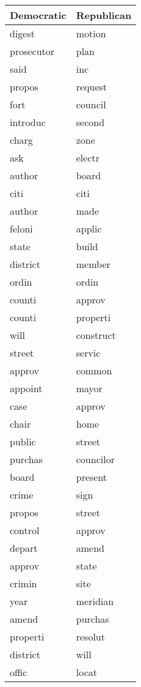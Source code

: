 \begin{table}[ht]
\centering
\begingroup\fontsize{9pt}{10pt}\selectfont
\begin{tabular}{ll}
  \hline
Democratic & Republican \\ 
  \hline
digest & motion \\ 
  prosecutor & plan \\ 
  said & inc \\ 
  propos & request \\ 
  fort & council \\ 
  introduc & second \\ 
  charg & zone \\ 
  ask & electr \\ 
  author & board \\ 
  citi & citi \\ 
  author & made \\ 
  feloni & applic \\ 
  state & build \\ 
  district & member \\ 
  ordin & ordin \\ 
  counti & approv \\ 
  counti & properti \\ 
  will & construct \\ 
  street & servic \\ 
  approv & common \\ 
  appoint & mayor \\ 
  case & approv \\ 
  chair & home \\ 
  public & street \\ 
  purchas & councilor \\ 
  board & present \\ 
  crime & sign \\ 
  propos & street \\ 
  control & approv \\ 
  depart & amend \\ 
  approv & state \\ 
  crimin & site \\ 
  year & meridian \\ 
  amend & purchas \\ 
  properti & resolut \\ 
  district & will \\ 
  offic & locat \\ 

\end{tabular}
\end{table}
